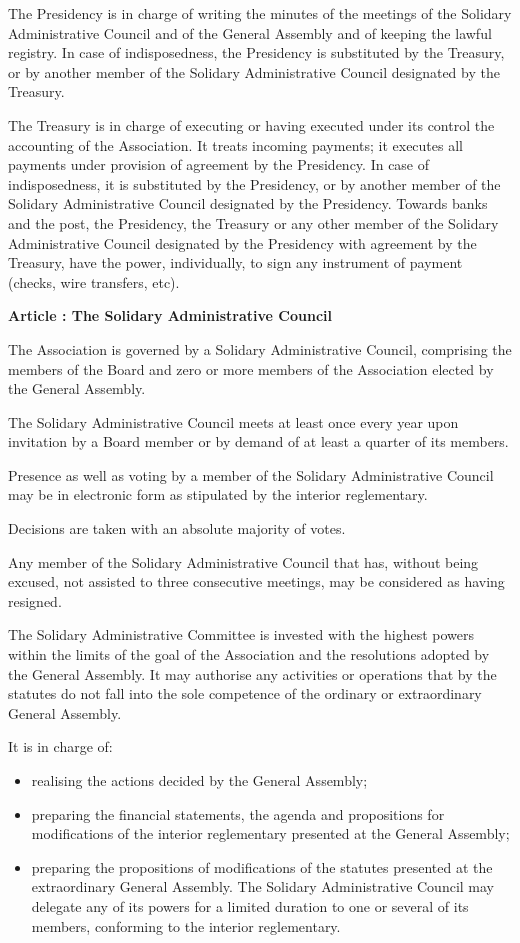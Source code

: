 \documentclass [11pt]{article}
\renewcommand {\section}[1]{\stepcounter {section}%
{\vspace {1em}\noindent\Large \bf Article \thesection: #1 \par}}
\begin{document}
The Presidency is in charge of writing the minutes of the meetings of the
Solidary Administrative Council and of the General Assembly and of keeping
the lawful registry. In case of indisposedness, the Presidency is substituted
by the Treasury, or by another member of the Solidary Administrative Council
designated by the Treasury.

The Treasury is in charge of executing or having executed under its control
the accounting of the Association. It treats incoming payments; it executes
all payments under provision of agreement by the Presidency. In case of
indisposedness, it is substituted by the Presidency, or by another member
of the Solidary Administrative Council designated by the Presidency.
Towards banks and the post, the Presidency, the Treasury or any other member
of the Solidary Administrative Council designated by the Presidency with
agreement by the Treasury, have the power, individually, to sign any
instrument of payment (checks, wire transfers, etc).


\section {The Solidary Administrative Council}

The Association is governed by a Solidary Administrative Council,
comprising the members of the Board and zero or more members of the
Association elected by the General Assembly.

The Solidary Administrative Council meets at least once every year
upon invitation by a Board member or by demand of at least a quarter
of its members.

Presence as well as voting by a member of the Solidary Administrative
Council may be in electronic form as stipulated by the interior reglementary.

Decisions are taken with an absolute majority of votes.

Any member of the Solidary Administrative Council that has, without being
excused, not assisted to three consecutive meetings, may be considered
as having resigned.

The Solidary Administrative Committee is invested with the highest powers
within the limits of the goal of the Association and the resolutions
adopted by the General Assembly. It may authorise any activities or
operations that by the statutes do not fall into the sole competence
of the ordinary or extraordinary General Assembly.

It is in charge of:
\begin {itemize}
\item
realising the actions decided by the General Assembly;
\item
preparing the financial statements, the agenda and propositions
for modifications of the interior reglementary presented at the
General Assembly;
\item
preparing the propositions of modifications of the statutes presented
at the extraordinary General Assembly. The Solidary Administrative Council
may delegate any of its powers for a limited duration to one or several
of its members, conforming to the interior reglementary.
\end {itemize}
\end{document}
